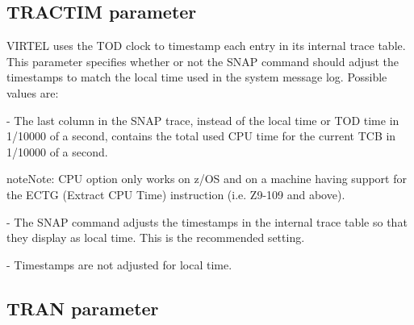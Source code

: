 \documentclass[letterpaper,10pt,english]{sphinxmanual}
\begin{document}
\ignorespaces 

\subsection{TRACTIM parameter}
\label{\detokenize{Installation_Guide:tractim-parameter}}\label{\detokenize{Installation_Guide:index-131}}
\begin{sphinxVerbatim}[commandchars=\\\{\}]
 
\end{sphinxVerbatim}

VIRTEL uses the TOD clock to timestamp each entry in its internal trace table. This parameter specifies whether or not the SNAP command should adjust the timestamps to match the local time used in the system message log. Possible values are:

 - The last column in the SNAP trace, instead of the local time or TOD time in 1/10000 of a second, contains the total used CPU time for the current TCB in 1/10000 of a second.

\begin{sphinxadmonition}{note}{Note:}
CPU option only works on z/OS and on a machine having support for the ECTG (Extract CPU Time) instruction (i.e. Z9-109 and above).
\end{sphinxadmonition}

 - The SNAP command adjusts the timestamps in the internal trace table so that they display as local time. This is the recommended setting.

 - Timestamps are not adjusted for local time.

\ignorespaces 

\subsection{TRAN parameter}
\label{\detokenize{Installation_Guide:tran-parameter}}\label{\detokenize{Installation_Guide:index-132}}
\begin{sphinxVerbatim}[commandchars=\\\{\}]
 
\end{sphinxVerbatim}
\end{document}
